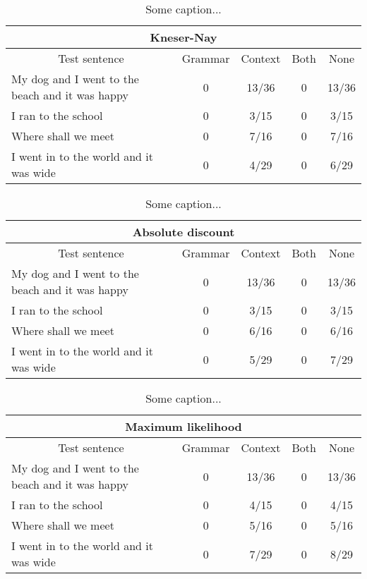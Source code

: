 \begin{table}[H]
\centering
\caption{Some caption...}
{\scriptsize
\begin{tabular}{ |p{}|c|c|c|c| }
	\hline
	\multicolumn{5}{|c|}{Kneser-Nay} \\
	\hline
	\multicolumn{1}{|c|}{Test sentence} & Grammar & Context & Both & None \\
	\hline
	My dog and I went to the beach and it was happy & 0 & 13/36 & 0 & 13/36 \\
	\hline
	I ran to the school & 0 & 3/15 & 0 & 3/15 \\
	\hline
	Where shall we meet & 0 & 7/16 & 0 & 7/16 \\
	\hline
	I went in to the world and it was wide & 0 & 4/29 & 0 & 6/29 \\
	\hline
\end{tabular}
}
\end{table}

\vspace{-1cm}
\begin{table}[H]
\centering
\caption{Some caption...}
{\scriptsize
\begin{tabular}{ |p{}|c|c|c|c| }
	\hline
	\multicolumn{5}{|c|}{Absolute discount} \\
	\hline
	\multicolumn{1}{|c|}{Test sentence} & Grammar & Context & Both & None \\
	\hline
	My dog and I went to the beach and it was happy & 0 & 13/36 & 0 & 13/36 \\
	\hline
	I ran to the school & 0 & 3/15 & 0 & 3/15 \\
	\hline
	Where shall we meet & 0 & 6/16 & 0 & 6/16 \\
	\hline
	I went in to the world and it was wide & 0 & 5/29 & 0 & 7/29 \\
	\hline
\end{tabular}
}
\end{table}

\vspace{-1cm}
\begin{table}[H]
\centering
\caption{Some caption...}
{\scriptsize
\begin{tabular}{ |p{}|c|c|c|c| }
	\hline
	\multicolumn{5}{|c|}{Maximum likelihood} \\
	\hline
	\multicolumn{1}{|c|}{Test sentence} & Grammar & Context & Both & None \\
	\hline
	My dog and I went to the beach and it was happy & 0 & 13/36 & 0 &13/36 \\
	\hline
	I ran to the school & 0 & 4/15 & 0 & 4/15 \\
	\hline
	Where shall we meet & 0 & 5/16 & 0 & 5/16 \\
	\hline
	I went in to the world and it was wide & 0 & 7/29 & 0 & 8/29 \\
	\hline
\end{tabular}
}
\end{table}

